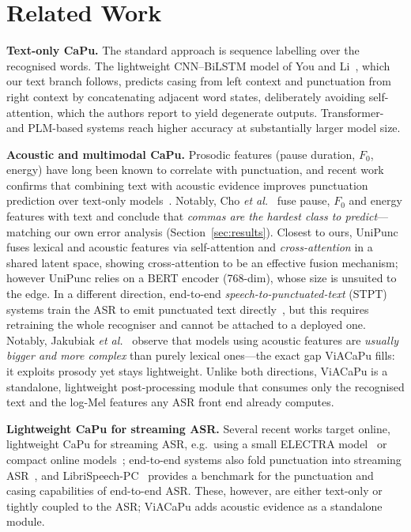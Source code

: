 \documentclass[conference]{IEEEtran}
\begin{document}
\section{Related Work}

\textbf{Text-only CaPu.} The standard approach is sequence labelling over the
recognised words. The lightweight CNN--BiLSTM model of You and
Li~\cite{you2024lightweight}, which our text branch follows, predicts casing from
left context and punctuation from right context by concatenating adjacent word
states, deliberately avoiding self-attention, which the authors report to yield
degenerate outputs. Transformer- and PLM-based systems reach higher accuracy at
substantially larger model size.

\textbf{Acoustic and multimodal CaPu.} Prosodic features (pause duration, $F_0$,
energy) have long been known to correlate with punctuation, and recent work
confirms that combining text with acoustic evidence improves punctuation
prediction over text-only models~\cite{cho2022,tran2020}. Notably, Cho \emph{et
al.}~\cite{cho2022} fuse pause, $F_0$ and energy features with text and conclude
that \emph{commas are the hardest class to predict}---matching our own error
analysis (Section~\ref{sec:results}). Closest to ours, UniPunc~\cite{unipunc}
fuses
lexical and acoustic features via self-attention and \emph{cross-attention} in a
shared latent space, showing cross-attention to be an effective fusion mechanism;
however UniPunc relies on a BERT encoder (768-dim), whose size is unsuited to the
edge. In a different direction, end-to-end \emph{speech-to-punctuated-text} (STPT)
systems train the ASR to emit punctuated text directly~\cite{stpt}, but this
requires retraining the whole recogniser and cannot be attached to a deployed one.
Notably, Jakubiak \emph{et al.}~\cite{stpt} observe that models using acoustic
features are \emph{usually bigger and more complex} than purely lexical ones---the
exact gap ViACaPu fills: it exploits prosody yet stays lightweight. Unlike both
directions, ViACaPu is a standalone, lightweight post-processing module that
consumes only the recognised text and the log-Mel features any ASR front end
already computes.

\textbf{Lightweight CaPu for streaming ASR.} Several recent works target online,
lightweight CaPu for streaming ASR, e.g.\ using a small ELECTRA
model~\cite{polacek2023} or compact online models~\cite{lightweight2025};
end-to-end systems also fold punctuation into streaming ASR~\cite{kim2023}, and
LibriSpeech-PC~\cite{librispeechpc} provides a benchmark for the punctuation and
casing capabilities of end-to-end ASR. These, however, are either text-only or
tightly coupled to the ASR; ViACaPu adds acoustic evidence as a standalone module.
\end{document}
